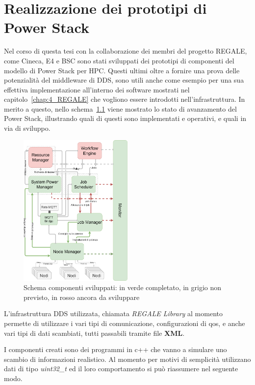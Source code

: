 \chapter{Realizzazione dei prototipi di Power Stack}
Nel corso di questa tesi con la collaborazione dei membri del progetto REGALE, come Cineca\cite{Cineca}, E4\cite{E4} e BSC\cite{BSC} sono stati sviluppati dei prototipi di componenti del modello di Power Stack per HPC.
Questi ultimi oltre a fornire una prova delle potenzialità del middleware di DDS, sono utili anche come esempio per una sua effettiva implementazione all'interno dei software mostrati nel capitolo~\ref{chap:4_REGALE} che vogliono essere introdotti nell'infrastruttura.
In merito a questo, nello schema~\ref{fig:schema_global_dummy_implementati} viene mostrato lo stato di avanzamento del Power Stack, illustrando quali di questi sono implementati e operativi, e quali in via di sviluppo.

\begin{figure}[H]
    \centering
    \includegraphics[width=0.5\textwidth]{./img/SchemaPowerStack_perdummy.drawio.png} %
    \caption{Schema componenti sviluppati: in verde completato, in grigio non previsto, in rosso ancora da sviluppare}
    \label{fig:schema_global_dummy_implementati}
\end{figure}
L'infrastruttura DDS utilizzata, chiamata \emph{REGALE Library} al momento permette di utilizzare i vari tipi di comunicazione, configurazioni di qos, e anche vari tipi di dati scambiati, tutti passabili tramite file \textbf{XML}.

I componenti creati sono dei programmi in c++ che vanno a simulare uno scambio di informazioni realistico. Al momento per motivi di semplicità utilizzano dati di tipo \emph{uint32\_t} ed il loro comportamento si può riassumere nel seguente modo.

